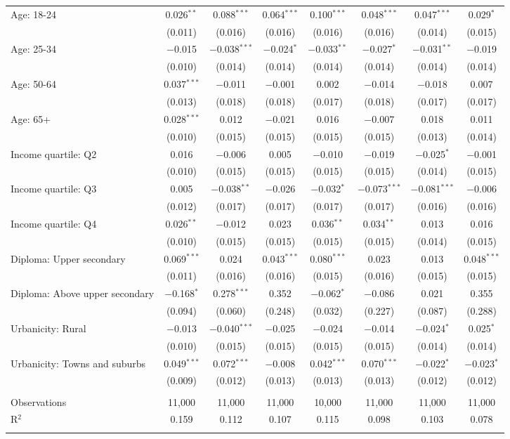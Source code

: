 \begin{tabular}{@{\extracolsep{5pt}}lccccccc}
  Age: 18\mbox{-}24 & 0.026$^{**}$ & 0.088$^{***}$ & 0.064$^{***}$ & 0.100$^{***}$ & 0.048$^{***}$ & 0.047$^{***}$ & 0.029$^{*}$ \\ 
  & (0.011) & (0.016) & (0.016) & (0.016) & (0.016) & (0.014) & (0.015) \\ 
  Age: 25\mbox{-}34 & $-$0.015 & $-$0.038$^{***}$ & $-$0.024$^{*}$ & $-$0.033$^{**}$ & $-$0.027$^{*}$ & $-$0.031$^{**}$ & $-$0.019 \\ 
  & (0.010) & (0.014) & (0.014) & (0.014) & (0.014) & (0.014) & (0.014) \\ 
  Age: 50\mbox{-}64 & 0.037$^{***}$ & $-$0.011 & $-$0.001 & 0.002 & $-$0.014 & $-$0.018 & 0.007 \\ 
  & (0.013) & (0.018) & (0.018) & (0.017) & (0.018) & (0.017) & (0.017) \\ 
  Age: 65+ & 0.028$^{***}$ & 0.012 & $-$0.021 & 0.016 & $-$0.007 & 0.018 & 0.011 \\ 
  & (0.010) & (0.015) & (0.015) & (0.015) & (0.015) & (0.013) & (0.014) \\ 
  Income quartile: Q2 & 0.016 & $-$0.006 & 0.005 & $-$0.010 & $-$0.019 & $-$0.025$^{*}$ & $-$0.001 \\ 
  & (0.010) & (0.015) & (0.015) & (0.015) & (0.015) & (0.014) & (0.015) \\ 
  Income quartile: Q3 & 0.005 & $-$0.038$^{**}$ & $-$0.026 & $-$0.032$^{*}$ & $-$0.073$^{***}$ & $-$0.081$^{***}$ & $-$0.006 \\ 
  & (0.012) & (0.017) & (0.017) & (0.017) & (0.017) & (0.016) & (0.016) \\ 
  Income quartile: Q4 & 0.026$^{**}$ & $-$0.012 & 0.023 & 0.036$^{**}$ & 0.034$^{**}$ & 0.013 & 0.016 \\ 
  & (0.010) & (0.015) & (0.015) & (0.015) & (0.015) & (0.014) & (0.015) \\ 
  Diploma: Upper secondary & 0.069$^{***}$ & 0.024 & 0.043$^{***}$ & 0.080$^{***}$ & 0.023 & 0.013 & 0.048$^{***}$ \\ 
  & (0.011) & (0.016) & (0.016) & (0.015) & (0.016) & (0.015) & (0.015) \\ 
  Diploma: Above upper secondary & $-$0.168$^{*}$ & 0.278$^{***}$ & 0.352 & $-$0.062$^{*}$ & $-$0.086 & 0.021 & 0.355 \\ 
  & (0.094) & (0.060) & (0.248) & (0.032) & (0.227) & (0.087) & (0.288) \\ 
  Urbanicity: Rural & $-$0.013 & $-$0.040$^{***}$ & $-$0.025 & $-$0.024 & $-$0.014 & $-$0.024$^{*}$ & 0.025$^{*}$ \\ 
  & (0.010) & (0.015) & (0.015) & (0.015) & (0.015) & (0.014) & (0.014) \\ 
  Urbanicity: Towns and suburbs & 0.049$^{***}$ & 0.072$^{***}$ & $-$0.008 & 0.042$^{***}$ & 0.070$^{***}$ & $-$0.022$^{*}$ & $-$0.023$^{*}$ \\ 
  & (0.009) & (0.012) & (0.013) & (0.013) & (0.013) & (0.012) & (0.012) \\ 
 \hline \\[-1.8ex] 

Observations & 11,000 & 11,000 & 11,000 & 10,000 & 11,000 & 11,000 & 11,000 \\ 
R$^{2}$ & 0.159 & 0.112 & 0.107 & 0.115 & 0.098 & 0.103 & 0.078 \\ 
\hline 
\hline \\[-1.8ex] 
\end{tabular} 